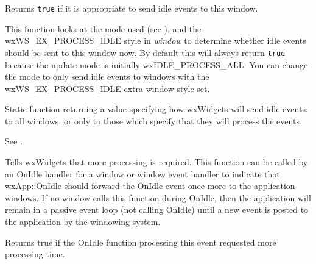 
Returns {\tt true} if it is appropriate to send idle events to
this window.

This function looks at the mode used (see ),
and the wxWS\_EX\_PROCESS\_IDLE style in {\it window} to determine whether idle events should be sent to
this window now. By default this will always return {\tt true} because
the update mode is initially wxIDLE\_PROCESS\_ALL. You can change the mode
to only send idle events to windows with the wxWS\_EX\_PROCESS\_IDLE extra window style set.



\label{wxidleeventgetmode}


Static function returning a value specifying how wxWidgets
will send idle events: to all windows, or only to those which specify that they
will process the events.

See .

\label{wxidleeventrequestmore}


Tells wxWidgets that more processing is required. This function can be called by an OnIdle
handler for a window or window event handler to indicate that wxApp::OnIdle should
forward the OnIdle event once more to the application windows. If no window calls this function
during OnIdle, then the application will remain in a passive event loop (not calling OnIdle) until a
new event is posted to the application by the windowing system.



\label{wxidleeventmorerequested}


Returns true if the OnIdle function processing this event requested more processing time.



